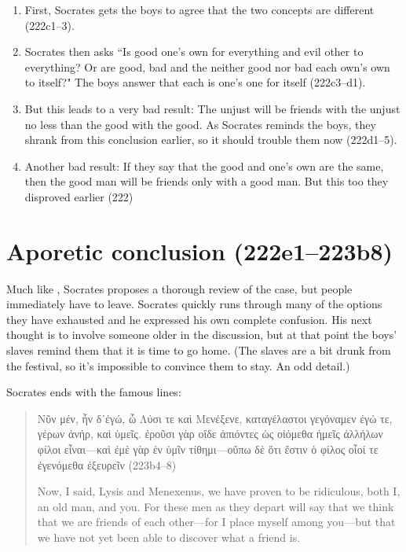 \documentclass[11pt]{article}
\begin{document}
\begin{enumerate}

    \item First, Socrates gets the boys to agree that the two concepts are
        different (222c1--3).

    \item Socrates then asks ``Is good one's own for everything and evil other
        to everything? Or are good, bad and the neither good nor bad each own's
        own to itself?"  The boys answer that each is one's one for itself
        (222c3--d1).

    \item But this leads to a very bad result: The unjust will be friends with
        the unjust no less than the good with the good.  As Socrates reminds
        the boys, they shrank from this conclusion earlier, so it should
        trouble them now (222d1--5).

    \item Another bad result: If they say that the good and one's own are the
        same, then the good man will be friends only with a good man.  But this
        too they disproved earlier (222)

\end{enumerate}


\section{Aporetic conclusion (222e1--223b8)}

Much like , Socrates proposes a thorough review of the case,
but people immediately have to leave.  Socrates quickly runs through many of
the options they have exhausted and he expressed his own complete confusion.
His next thought is to involve someone older in the discussion, but at that
point the boys' slaves remind them that it is time to go home.  (The slaves are
a bit drunk from the festival, so it's impossible to convince them to stay.  An
odd detail.)

Socrates ends with the famous lines:

\begin{quote}

    {\g Νῦν μέν, ἦν δ᾽ἐγώ, ὦ Λύσι τε καὶ Μενέξενε, καταγέλαστοι γεγόναμεν ἐγώ
    τε, γέρων ἀνήρ, καὶ ὑμεῖς.  ἐροῦσι γὰρ οἵδε ἀπιόντες ὡς οἰόμεθα ἡμεῖς
ἀλλήλων φίλοι εἶναι---καὶ ἐμὲ γὰρ ἐν ὑμῖν τίθημι---οὔπω δὲ ὅτι ἔστιν ὁ φίλος
οἷοί τε ἐγενόμεθα ἐξευρεῖν} (223b4--8)

    Now, I said, Lysis and Menexenus, we have proven to be ridiculous, both I,
    an old man, and you.  For these men as they depart will say that we think
    that we are friends of each other---for I place myself among you---but that
    we have not yet been able to discover what a friend is.

\end{quote}
\end{document}
